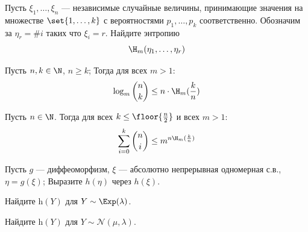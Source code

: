 \documentclass[seminar, recordsfile={../records.lua}]{practice}
\newcommand{\h}{\mathrm{h}}
\begin{document}
\begin{exercise}
	Пусть $\xi_1, \ldots, \xi_n$ --- независимые случайные величины, принимающие значения на множестве $\set{1, \ldots, k}$ с вероятностями $p_1, \ldots, p_k$ соответственно. Обозначим за $\eta_{r} = \# i \text{ таких что } \xi_i = r$. Найдите энтропию
	$$
		\H_m(\eta_1, \ldots, \eta_r)
	$$
\end{exercise}
\begin{exercise}
	Пусть $n, k \in \N$, $n \geq k$; Тогда для всех $m > 1$:
	\[
		\log_m\binom{n}{k} \leq n \cdot \H_m(\frac{k}{n})
	\]
\end{exercise}
\begin{exercise}
	Пусть $n \in \N$. Тогда для всех $k \leq \floor{\frac{n}{2}}$ и всех $m > 1$:
	\[
		\sum_{i = 0}^{k}\binom{n}{i} \leq m^{n\H_m(\frac{k}{n})}
	\]
\end{exercise}
\begin{exercise}
	Пусть $g$ --- диффеоморфизм, $\xi$ --- абсолютно непрерывная одномерная с.в., $\eta = g(\xi)$; Выразите $h(\eta)$ через $h(\xi)$.
\end{exercise}
\begin{exercise}
	Найдите $\h(Y)$ для $Y \sim \Exp(\lambda)$.
\end{exercise}
\begin{exercise}
	Найдите $\h(Y)$ для $Y \sim \mathcal{N}(\mu, \lambda)$.
\end{exercise}
\end{document}
